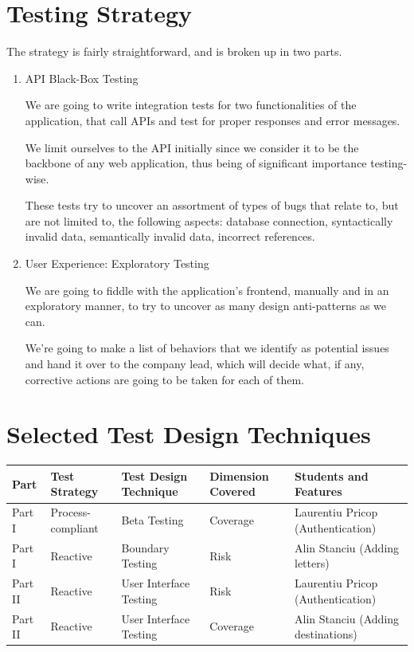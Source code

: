 \documentclass{article}
\begin{document}
\section{Testing Strategy}

The strategy is fairly straightforward, and is broken up in two parts.

\begin{enumerate}
    \item API Black-Box Testing

          We are going to write integration tests for two functionalities of the application, that call APIs and test for proper responses and error messages.

          We limit ourselves to the API initially since we consider it to be the backbone of any web application, thus being of significant importance testing-wise.

          These tests try to uncover an assortment of types of bugs that relate to, but are not limited to, the following aspects: database connection, syntactically invalid data, semantically invalid data, incorrect references.

    \item User Experience: Exploratory Testing

          We are going to fiddle with the application's frontend, manually and in an exploratory manner, to try to uncover as many design anti-patterns as we can.

          We're going to make a list of behaviors that we identify as potential issues and hand it over to the company lead, which will decide what, if any, corrective actions are going to be taken for each of them.
\end{enumerate}

\section{Selected Test Design Techniques}

\begin{tabularx}{\textwidth}{|X|X|X|X|X|}
    \hline
    Part    & Test Strategy     & Test Design Technique  & Dimension Covered & Students and Features              \\
    \hline
    Part I  & Process-compliant & Beta Testing           & Coverage          & Laurentiu Pricop (Authentication)  \\
    \hline
    Part I  & Reactive          & Boundary Testing       & Risk              & Alin Stanciu (Adding letters)      \\
    \hline
    Part II & Reactive          & User Interface Testing & Risk              & Laurentiu Pricop (Authentication)  \\
    \hline
    Part II & Reactive          & User Interface Testing & Coverage          & Alin Stanciu (Adding destinations) \\
    \hline
\end{tabularx}
\end{document}
